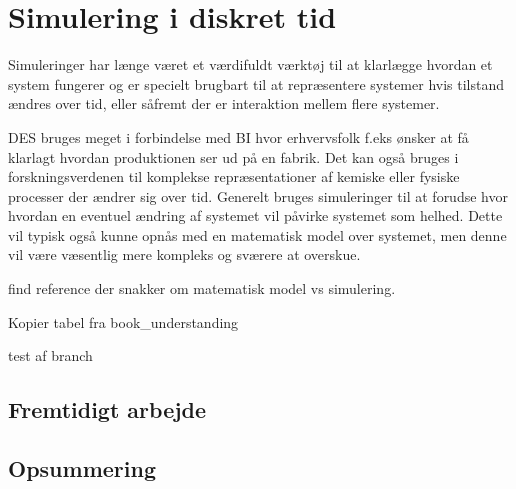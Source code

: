 \chapter{Simulering i diskret tid}
Simuleringer har længe været et værdifuldt værktøj til at klarlægge hvordan et 
system fungerer og er specielt brugbart til at repræsentere systemer hvis 
tilstand ændres over tid, eller såfremt der er interaktion mellem flere systemer.

DES bruges meget i forbindelse med BI hvor erhvervsfolk f.eks ønsker at få klarlagt hvordan produktionen ser ud på en fabrik. Det kan også bruges i forskningsverdenen til komplekse repræsentationer af kemiske eller fysiske processer der ændrer sig over tid. 
Generelt bruges simuleringer til at forudse hvor hvordan en eventuel ændring af systemet vil påvirke systemet som helhed. Dette vil typisk også kunne opnås med en matematisk model over systemet, men denne vil være væsentlig mere kompleks og sværere at overskue. 

find reference der snakker om matematisk model vs simulering. 

Kopier tabel fra book\_understanding

test af branch


 

\section{Fremtidigt arbejde}
\section{Opsummering}
